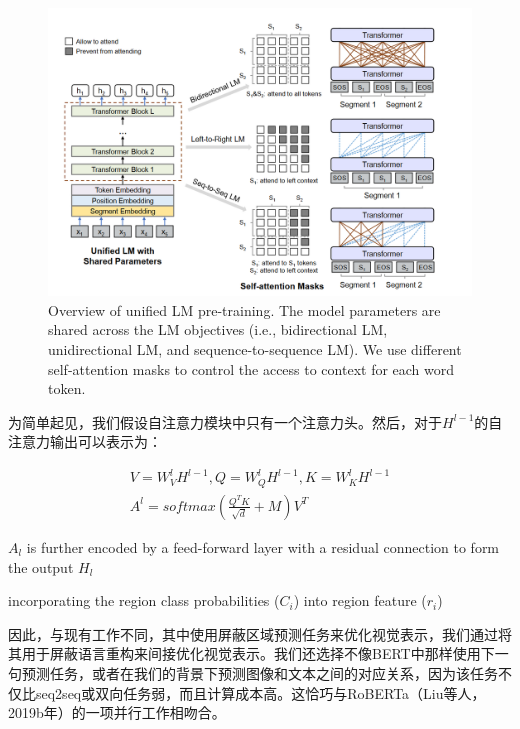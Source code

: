 \documentclass[a4paper]{article}
\begin{document}
\begin{sloppypar}
      \begin{figure}[h]
            \centering
            \includegraphics[scale=0.5]{uniml}
            \caption{Overview of unified LM pre-training. The model parameters are shared across the LM objectives (i.e., bidirectional LM, unidirectional LM, and sequence-to-sequence LM). We use different self-attention masks to control the access to context for each word token. }
            \label{uniml}
      \end{figure}

      为简单起见，我们假设自注意力模块中只有一个注意力头。然后，对于$H^{l-1}$的自注意力输出可以表示为：

      \begin{gather}
            V=W^l_VH^{l-1},Q=W^l_QH^{l-1},K=W^l_KH^{l-1}\\
            A^l=softmax(\frac{Q^TK}{\sqrt d}+M)V^T
      \end{gather}

      $A_l$ is further encoded by a feed-forward layer with a residual connection to form the output $H_l$





      incorporating the region class probabilities ($C_i$) into region feature ($r_i$)


      因此，与现有工作不同，其中使用屏蔽区域预测任务来优化视觉表示，我们通过将其用于屏蔽语言重构来间接优化视觉表示。我们还选择不像BERT中那样使用下一句预测任务，或者在我们的背景下预测图像和文本之间的对应关系，因为该任务不仅比seq2seq或双向任务弱，而且计算成本高。这恰巧与RoBERTa（Liu等人，2019b年）的一项并行工作相吻合。



\end{sloppypar}
\end{document}
